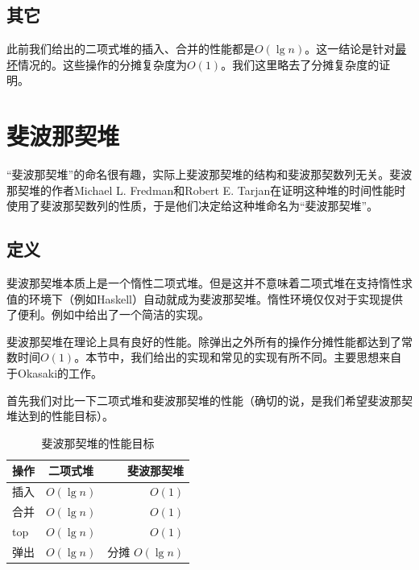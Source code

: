 \documentclass[b5paper]{ctexart}
\begin{document}
\subsection{其它}
此前我们给出的二项式堆的插入、合并的性能都是$O(\lg n)$。这一结论是针对\underline{最坏}情况的。这些操作的分摊复杂度为$O(1)$。我们这里略去了分摊复杂度的证明。

\section{斐波那契堆}
\label{fib-heap} 

“斐波那契堆”的命名很有趣，实际上斐波那契堆的结构和斐波那契数列无关。斐波那契堆的作者Michael L. Fredman和Robert E. Tarjan在证明这种堆的时间性能时使用了斐波那契数列的性质，于是他们决定给这种堆命名为“斐波那契堆”\cite{CLRS}。

\subsection{定义}

斐波那契堆本质上是一个惰性二项式堆。但是这并不意味着二项式堆在支持惰性求值的环境下（例如Haskell）自动就成为斐波那契堆。惰性环境仅仅对于实现提供了便利。例如\cite{hackage-fibq}中给出了一个简洁的实现。

斐波那契堆在理论上具有良好的性能。除弹出之外所有的操作分摊性能都达到了常数时间$O(1)$。本节中，我们给出的实现和常见的实现\cite{CLRS}有所不同。主要思想来自于Okasaki的工作\cite{okasaki-fibh}。

首先我们对比一下二项式堆和斐波那契堆的性能（确切的说，是我们希望斐波那契堆达到的性能目标）。

\begin{table}[htbp]
\centering
\begin{tabular}{l | c | r}
  \hline
  操作 & 二项式堆 & 斐波那契堆 \\
  \hline
  插入 & $O(\lg n)$ & $O(1)$ \\
  合并 & $O(\lg n)$ & $O(1)$ \\
  top & $O(\lg n)$ & $O(1)$ \\
  弹出 & $O(\lg n)$ & 分摊 $O(\lg n)$ \\
  \hline
\end{tabular}
\caption{斐波那契堆的性能目标}
\end{table}
\end{document}
